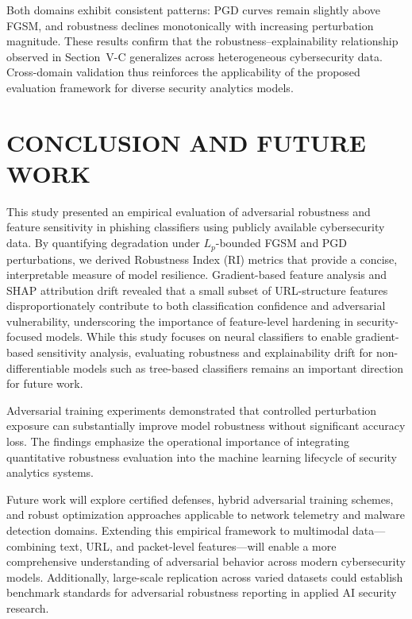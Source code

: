 \documentclass[a4paper,twoside]{article}
\begin{document}
Both domains exhibit consistent patterns: PGD curves remain slightly above FGSM,
and robustness declines monotonically with increasing perturbation magnitude.
These results confirm that the robustness–explainability relationship observed
in Section~V-C generalizes across heterogeneous cybersecurity data.
Cross-domain validation thus reinforces the applicability of the proposed
evaluation framework for diverse security analytics models.

\section{\uppercase{Conclusion and Future Work}}

This study presented an empirical evaluation of adversarial robustness and feature sensitivity 
in phishing classifiers using publicly available cybersecurity data. 
By quantifying degradation under $L_p$-bounded FGSM and PGD perturbations, 
we derived Robustness Index (RI) metrics that provide a concise, interpretable measure 
of model resilience. 
Gradient-based feature analysis and SHAP attribution drift revealed that 
a small subset of URL-structure features disproportionately contribute to both 
classification confidence and adversarial vulnerability, underscoring the 
importance of feature-level hardening in security-focused models. While this study focuses on neural classifiers to enable gradient-based sensitivity analysis,
evaluating robustness and explainability drift for non-differentiable models
such as tree-based classifiers remains an important direction for future work.

Adversarial training experiments demonstrated that controlled perturbation exposure 
can substantially improve model robustness without significant accuracy loss. 
The findings emphasize the operational importance of integrating quantitative robustness 
evaluation into the machine learning lifecycle of security analytics systems. 

Future work will explore certified defenses, hybrid adversarial training schemes, 
and robust optimization approaches applicable to network telemetry and malware detection domains. 
Extending this empirical framework to multimodal data---combining text, URL, and packet-level features---will 
enable a more comprehensive understanding of adversarial behavior across modern cybersecurity models. 
Additionally, large-scale replication across varied datasets could establish benchmark standards 
for adversarial robustness reporting in applied AI security research.
\end{document}
